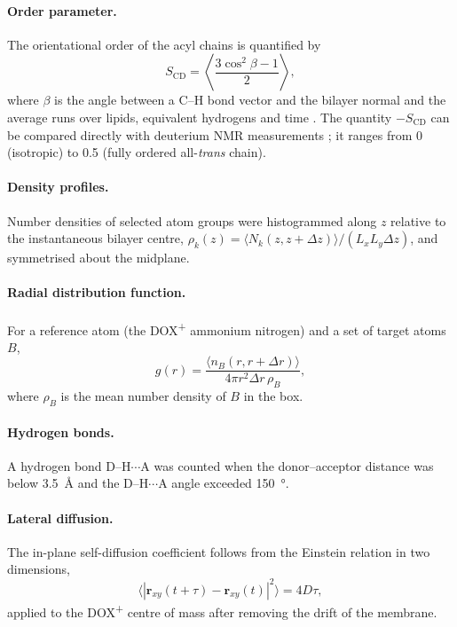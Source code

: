 \documentclass[11pt,a4paper]{article}
\newcommand{\dox}{DOX\textsuperscript{+}}
\newcommand{\scd}{S_{\mathrm{CD}}}
\begin{document}
\paragraph{Order parameter.}
The orientational order of the acyl chains is quantified by
\begin{equation}
  \scd = \left\langle \frac{3\cos^2\beta - 1}{2} \right\rangle ,
  \label{eq:scd}
\end{equation}
where $\beta$ is the angle between a C--H bond vector and the bilayer normal and the average runs over
lipids, equivalent hydrogens and time \cite{vermeer2007}. The quantity $-\scd$ can be compared directly
with deuterium NMR measurements \cite{seelig1974}; it ranges from 0 (isotropic) to 0.5 (fully ordered
all-\emph{trans} chain).

\paragraph{Density profiles.}
Number densities of selected atom groups were histogrammed along $z$ relative to the instantaneous bilayer
centre, $\rho_k(z) = \langle N_k(z, z+\Delta z)\rangle / (L_xL_y\Delta z)$, and symmetrised about the
midplane.

\paragraph{Radial distribution function.}
For a reference atom (the \dox{} ammonium nitrogen) and a set of target atoms $B$,
\begin{equation}
  g(r) = \frac{\langle n_B(r, r+\Delta r)\rangle}{4\pi r^2 \Delta r\,\rho_B},
\end{equation}
where $\rho_B$ is the mean number density of $B$ in the box.

\paragraph{Hydrogen bonds.}
A hydrogen bond D--H$\cdots$A was counted when the donor--acceptor distance was below
\SI{3.5}{\angstrom} and the D--H$\cdots$A angle exceeded \SI{150}{\degree}.

\paragraph{Lateral diffusion.}
The in-plane self-diffusion coefficient follows from the Einstein relation in two dimensions,
\begin{equation}
  \langle |\mathbf{r}_{xy}(t+\tau) - \mathbf{r}_{xy}(t)|^2 \rangle = 4D\tau ,
  \label{eq:msd}
\end{equation}
applied to the \dox{} centre of mass after removing the drift of the membrane.
\end{document}
